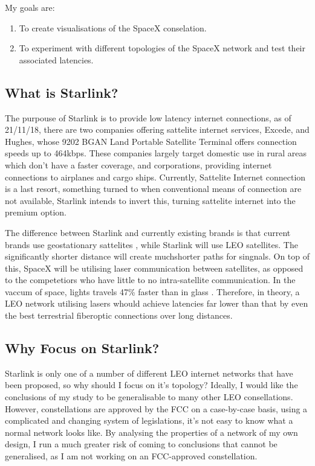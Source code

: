 \documentclass[12pt]{article}
\begin{document}
My goals are:
\begin{enumerate}
	\item To create visualisations of the SpaceX conselation.
	\item To experiment with different topologies of the SpaceX network and test their associated latencies. 
\end{enumerate}

\subsection{What is Starlink?}

The purpouse of Starlink is to provide low latency internet connections, as of 21/11/18, there are two companies offering sattelite internet services, Excede\cite{ExcedeWebsite}, and Hughes, whose 9202 BGAN Land Portable Satellite Terminal offers connection speeds up to 464kbps\cite{HughesWebsite}. These companies largely target domestic use in rural areas which don’t have a faster coverage, and corporations, providing internet connections to airplanes and cargo ships. Currently, Sattelite Internet connection is a last resort, something turned to when conventional means of connection are not available, Starlink intends to invert this, turning sattelite internet into the premium option. 

The difference between Starlink and currently existing brands is that current brands use geostationary sattelites \cite{HughesPressRelease}, while Starlink will use LEO satellites. The significantly shorter distance will create muchshorter paths for singnals. On top of this, SpaceX will be utilising laser communication between satellites, as opposed to the competetiors who have little to no intra-satellite communication. In the vaccum of space, lights travels 47\% faster than in glass \cite{PropertiesOfGlass}. Therefore, in theory, a LEO network utilising lasers whould achieve latencies far lower than that by even the best terrestrial fiberoptic connections over long distances.

\subsection{Why Focus on Starlink?}

Starlink is only one of a number of different LEO internet networks that have been proposed, so why should I focus on it's topology? Ideally, I would like the conclusions of my study to be generalisable to many other LEO consellations. However, constellations are approved by the FCC on a case-by-case basis, using a complicated and changing system of legislations, it's not easy to know what a normal network looks like. By analysing the properties of a network of my own design, I run a much greater risk of coming to conclusions that cannot be generalised, as I am not working on an FCC-approved constellation.
\end{document}
